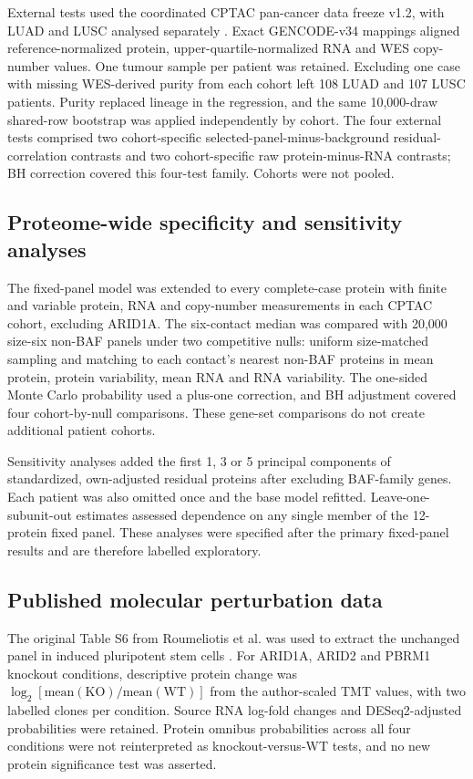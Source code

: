 \documentclass[journal=jprobs,manuscript=article,layout=traditional]{achemso}
\begin{document}
External tests used the coordinated CPTAC pan-cancer data freeze v1.2, with LUAD and LUSC analysed separately \citep{li2023proteogenomic,gillette2020,satpathy2021}. Exact GENCODE-v34 mappings aligned reference-normalized protein, upper-quartile-normalized RNA and WES copy-number values. One tumour sample per patient was retained. Excluding one case with missing WES-derived purity from each cohort left 108 LUAD and 107 LUSC patients. Purity replaced lineage in the regression, and the same 10,000-draw shared-row bootstrap was applied independently by cohort. The four external tests comprised two cohort-specific selected-panel-minus-background residual-correlation contrasts and two cohort-specific raw protein-minus-RNA contrasts; BH correction covered this four-test family. Cohorts were not pooled.

\subsection{Proteome-wide specificity and sensitivity analyses}

The fixed-panel model was extended to every complete-case protein with finite and variable protein, RNA and copy-number measurements in each CPTAC cohort, excluding ARID1A. The six-contact median was compared with 20,000 size-six non-BAF panels under two competitive nulls: uniform size-matched sampling and matching to each contact's nearest non-BAF proteins in mean protein, protein variability, mean RNA and RNA variability. The one-sided Monte Carlo probability used a plus-one correction, and BH adjustment covered four cohort-by-null comparisons. These gene-set comparisons do not create additional patient cohorts.

Sensitivity analyses added the first 1, 3 or 5 principal components of standardized, own-adjusted residual proteins after excluding BAF-family genes. Each patient was also omitted once and the base model refitted. Leave-one-subunit-out estimates assessed dependence on any single member of the 12-protein fixed panel. These analyses were specified after the primary fixed-panel results and are therefore labelled exploratory.

\subsection{Published molecular perturbation data}

The original Table S6 from Roumeliotis et al. was used to extract the unchanged panel in induced pluripotent stem cells \citep{roumeliotis2017}. For ARID1A, ARID2 and PBRM1 knockout conditions, descriptive protein change was $\log_2[\mathrm{mean(KO)}/\mathrm{mean(WT)}]$ from the author-scaled TMT values, with two labelled clones per condition. Source RNA log-fold changes and DESeq2-adjusted probabilities were retained. Protein omnibus probabilities across all four conditions were not reinterpreted as knockout-versus-WT tests, and no new protein significance test was asserted.
\end{document}
